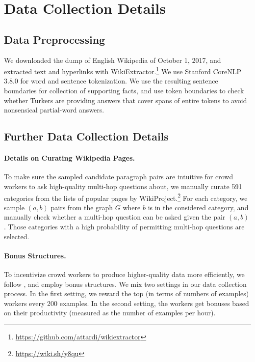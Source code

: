 \section{Data Collection Details} \label{sec:collection_details}


\subsection{Data Preprocessing}

We downloaded the dump of English Wikipedia of October 1, 2017, and extracted text and hyperlinks with WikiExtractor.\footnote{\url{https://github.com/attardi/wikiextractor}}
 We use Stanford CoreNLP 3.8.0 \cite{manning-EtAl:2014:P14-5} for word and sentence tokenization.
 We use the resulting sentence boundaries for collection of supporting facts, and use token boundaries to check whether Turkers are providing answers that cover spans of entire tokens to avoid nonsensical partial-word answers.

\subsection{Further Data Collection Details}

\paragraph{Details on Curating Wikipedia Pages.}
To make sure the sampled candidate paragraph pairs are intuitive for crowd workers to ask high-quality multi-hop questions about, we manually curate 591 categories from the lists of popular pages by WikiProject.\footnote{\url{https://wiki.sh/y8qu}}
For each category, we sample $(a, b)$ pairs from the graph $G$ where $b$ is in the considered category, and manually check whether a multi-hop question can be asked given the pair $(a, b)$.
Those categories with a high probability of permitting multi-hop questions are selected.

\paragraph{Bonus Structures.} To incentivize crowd workers to produce higher-quality data more efficiently, we follow \citet{yang2017mastering}, and employ bonus structures. We mix two settings in our data collection process. In the first setting, we reward the top (in terms of numbers of examples) workers every 200 examples. In the second setting, the workers get bonuses based on their productivity (measured as the number of examples per hour).

